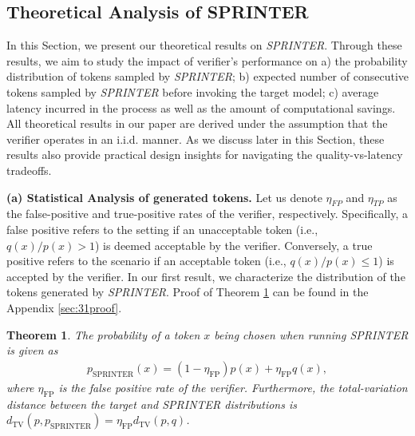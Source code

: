 \documentclass{article}
\newcommand{\revision}[1]{{\color{black} #1}}
\theoremstyle{plain}
\newtheorem{theorem}{Theorem}[section]
\theoremstyle{definition}
\theoremstyle{remark}
\begin{document}
\subsection{Theoretical Analysis of SPRINTER}\label{sec:theory}
In this Section, we present our theoretical results on \textit{SPRINTER}. Through these results, we aim to study the impact of verifier's performance on a) the probability distribution of tokens sampled by \textit{SPRINTER}; b) expected number of consecutive tokens sampled by \textit{SPRINTER} before invoking the target model; c) average latency incurred in the process as well as the amount of computational savings. \revision{All theoretical results in our paper are derived under the assumption that the verifier operates in an i.i.d. manner. }
 As we discuss later in this Section, these results also provide practical design insights for navigating the quality-vs-latency tradeoffs.  

\textbf{(a) Statistical Analysis of generated tokens.} Let us denote $\eta_{FP}$ and $\eta_{TP}$ as the false-positive and true-positive rates of the verifier, respectively. Specifically, a false positive refers to the setting if an unacceptable token (i.e., $q(x)/p(x)>1$) is deemed acceptable by the verifier. Conversely, a true positive refers to the scenario if an acceptable token (i.e., $q(x)/p(x)\leq 1$) is accepted by the verifier. 
In our first result, we characterize the distribution of the tokens generated by \textit{SPRINTER}. Proof of Theorem \ref{the:SPRINTER} can be found in the Appendix \ref{sec:31proof}.
\begin{theorem}\label{the:SPRINTER}
    The probability of a token $x$ being chosen when running SPRINTER is given as
    \begin{align}
    \label{eq:SPRINT_DIST}
        p_\text{SPRINTER}(x) = (1-\eta_\text{FP})p(x) + \eta_\text{FP} q(x),
    \end{align}
    where $\eta_\text{FP}$ is the false positive rate of the verifier. Furthermore, the total-variation distance between the target and \textit{SPRINTER} distributions is $d_\text{TV}(p,p_\text{SPRINTER}) = \eta_\text{FP}d_\text{TV}(p,q)$.
\end{theorem}
\end{document}
